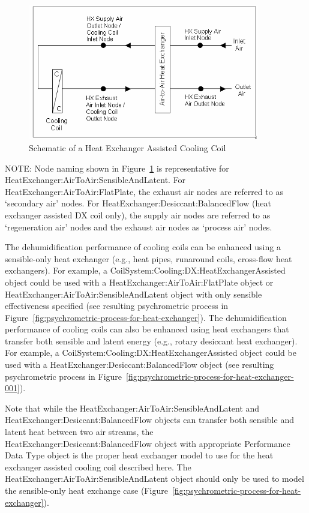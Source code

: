 \begin{figure}[hbtp] %
\centering
\includegraphics[width=0.9\textwidth, height=0.9\textheight, keepaspectratio=true]{media/image4091.png}
\caption{Schematic of a Heat Exchanger Assisted Cooling Coil \protect \label{fig:schematic-of-a-heat-exchanger-assisted}}
\end{figure}

NOTE: Node naming shown in Figure~\ref{fig:schematic-of-a-heat-exchanger-assisted} is representative for \\
HeatExchanger:AirToAir:SensibleAndLatent. For HeatExchanger:AirToAir:FlatPlate, the exhaust air nodes are referred to as `secondary air' nodes. For HeatExchanger:Desiccant:BalancedFlow (heat exchanger assisted DX coil only), the supply air nodes are referred to as `regeneration air' nodes and the exhaust air nodes as `process air' nodes.

The dehumidification performance of cooling coils can be enhanced using a sensible-only heat exchanger (e.g., heat pipes, runaround coils, cross-flow heat exchangers). For example, a CoilSystem:Cooling:DX:HeatExchangerAssisted object could be used with a HeatExchanger:AirToAir:FlatPlate object or HeatExchanger:AirToAir:SensibleAndLatent object with only sensible effectiveness specified (see resulting psychrometric process in Figure~\ref{fig:psychrometric-process-for-heat-exchanger}). The dehumidification performance of cooling coils can also be enhanced using heat exchangers that transfer both sensible and latent energy (e.g., rotary desiccant heat exchanger). For example, a CoilSystem:Cooling:DX:HeatExchangerAssisted object could be used with a HeatExchanger:Desiccant:BalancedFlow object (see resulting psychrometric process in Figure~\ref{fig:psychrometric-process-for-heat-exchanger-001}).

Note that while the HeatExchanger:AirToAir:SensibleAndLatent and HeatExchanger:Desiccant:BalancedFlow objects can transfer both sensible and latent heat between two air streams, the \\
HeatExchanger:Desiccant:BalancedFlow object with appropriate Performance Data Type object is the proper heat exchanger model to use for the heat exchanger assisted cooling coil described here. The HeatExchanger:AirToAir:SensibleAndLatent object should only be used to model the sensible-only heat exchange case (Figure~\ref{fig:psychrometric-process-for-heat-exchanger}).

